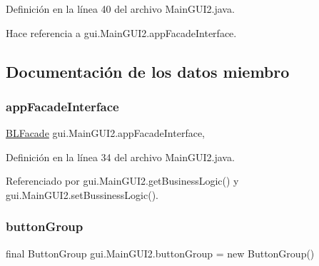 Definición en la línea 40 del archivo Main\+G\+U\+I2.\+java.


\begin{DoxyCode}{0}

\end{DoxyCode}


Hace referencia a gui.\+Main\+G\+U\+I2.\+app\+Facade\+Interface.



\subsection{Documentación de los datos miembro}
\mbox{\label{classgui_1_1MainGUI2_a1b35180c398b8bea7288e1d5892b33ba}} 
\subsubsection{\texorpdfstring{appFacadeInterface}{appFacadeInterface}}
{\footnotesize\ttfamily \mbox{\hyperlink{interfacebusinessLogic_1_1BLFacade}{B\+L\+Facade}} gui.\+Main\+G\+U\+I2.\+app\+Facade\+Interface\hspace{0.3cm}{\ttfamily [static]}, {\ttfamily [private]}}



Definición en la línea 34 del archivo Main\+G\+U\+I2.\+java.



Referenciado por gui.\+Main\+G\+U\+I2.\+get\+Business\+Logic() y gui.\+Main\+G\+U\+I2.\+set\+Bussiness\+Logic().

\mbox{\label{classgui_1_1MainGUI2_af9db5ce5da5af9ba51eead7f5f20a4e8}} 
\subsubsection{\texorpdfstring{buttonGroup}{buttonGroup}}
{\footnotesize\ttfamily final Button\+Group gui.\+Main\+G\+U\+I2.\+button\+Group = new Button\+Group()\hspace{0.3cm}{\ttfamily [private]}}



